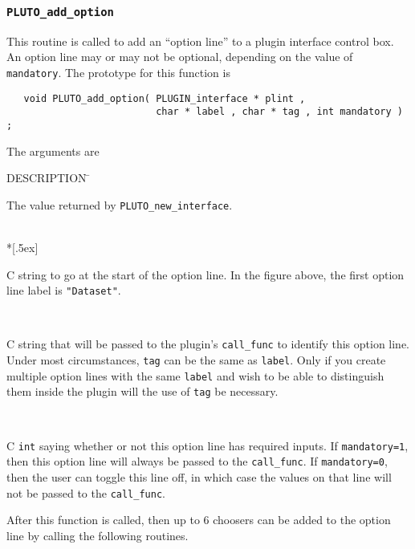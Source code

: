 \subsubsection{{\tt PLUTO\_add\_option}}
This routine is called to add an ``option line'' to a plugin interface control box.
An option line may or may not be optional, depending on the value of {\tt mandatory}.
The prototype for this function is
\begin{samepage}\begin{verbatim}
   void PLUTO_add_option( PLUGIN_interface * plint ,
                          char * label , char * tag , int mandatory ) ;
\end{verbatim}\end{samepage}
\vset\noindent
The arguments are
\renewcommand{\tb}[1]{\parbox[t]{5in}{\sloppy #1}}
\begin{tabbing}
 \blob DESCRIPTION \= \kill
%
  \> \tb{The value returned by {\tt PLUTO\_new\_interface}.} \\*[.5ex]
%
  \> \tb{C string to go at the start of the option line.
                         In the figure above, the first option line label is {\tt "Dataset"}.} \\[.5ex]
%
    \> \tb{C string that will be passed to the plugin's {\tt call\_func}
                         to identify this option line.  Under most circumstances,
                         {\tt tag} can be the same as {\tt label}.  Only if you create
                         multiple option lines with the same {\tt label} and wish to be
                         able to distinguish them inside the plugin will the use of
                         {\tt tag} be necessary.} \\[.5ex]
%
  \> \tb{C {\tt int} saying whether or not this option line has required
                             inputs.  If {\tt mandatory=1}, then this option line will
                             always be passed to the {\tt call\_func}.  If {\tt mandatory=0},
                             then the user can toggle this line off, in which case the
                             values on that line will not be passed to the {\tt call\_func}.}
\end{tabbing}
After this function is called, then up to 6 choosers can be added to the option line
by calling the following routines.

